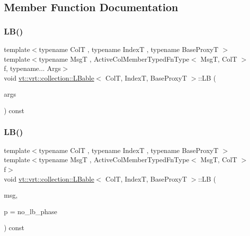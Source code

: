\subsection{Member Function Documentation}
\mbox{\label{structvt_1_1vrt_1_1collection_1_1_l_bable_ae7160fcd27761fb849d20ff440445cd7}} 
\subsubsection{\texorpdfstring{L\+B()}{LB()}\hspace{0.1cm}{\footnotesize\ttfamily [1/4]}}
{\footnotesize\ttfamily template$<$typename ColT , typename IndexT , typename Base\+ProxyT $>$ \\
template$<$typename MsgT , Active\+Col\+Member\+Typed\+Fn\+Type$<$ Msg\+T, Col\+T $>$ f, typename... Args$>$ \\
void \hyperlink{structvt_1_1vrt_1_1collection_1_1_l_bable}{vt\+::vrt\+::collection\+::\+L\+Bable}$<$ ColT, IndexT, Base\+ProxyT $>$\+::LB (\begin{DoxyParamCaption}\item[{Args \&\&...}]{args }\end{DoxyParamCaption}) const}

\mbox{\label{structvt_1_1vrt_1_1collection_1_1_l_bable_ab02f5bd0f16e318a8bdd4befe1819e74}} 
\subsubsection{\texorpdfstring{L\+B()}{LB()}\hspace{0.1cm}{\footnotesize\ttfamily [2/4]}}
{\footnotesize\ttfamily template$<$typename ColT , typename IndexT , typename Base\+ProxyT $>$ \\
template$<$typename MsgT , Active\+Col\+Member\+Typed\+Fn\+Type$<$ Msg\+T, Col\+T $>$ f$>$ \\
void \hyperlink{structvt_1_1vrt_1_1collection_1_1_l_bable}{vt\+::vrt\+::collection\+::\+L\+Bable}$<$ ColT, IndexT, Base\+ProxyT $>$\+::LB (\begin{DoxyParamCaption}\item[{MsgT $\ast$}]{msg,  }\item[{\hyperlink{namespacevt_a46ce6733d5cdbd735d561b7b4029f6d7}{Phase\+Type}}]{p = {\ttfamily no\+\_\+lb\+\_\+phase} }\end{DoxyParamCaption}) const}

